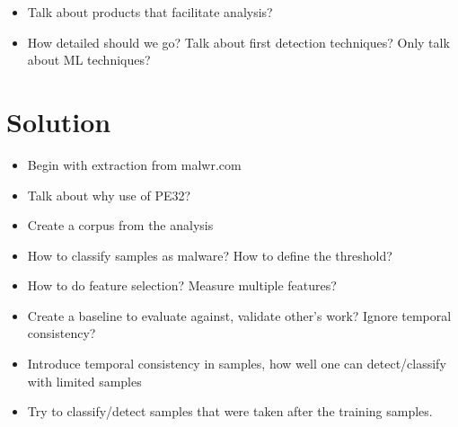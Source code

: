 \documentclass{llncs}
\begin{document}
\begin{itemize}
	\item Talk about products that facilitate analysis?
	\item How detailed should we go? Talk about first detection techniques? Only talk about ML techniques?
\end{itemize}

% 






\section{Solution}\label{sec_solution}

\begin{itemize}
	\item Begin with extraction from malwr.com
	\item Talk about why use of PE32?
	\item Create a corpus from the analysis
	\item How to classify samples as malware? How to define the threshold?
	\item How to do feature selection? Measure multiple features?
	\item Create a baseline to evaluate against, validate other's work? Ignore temporal consistency?
	\item Introduce temporal consistency in samples, how well one can detect/classify with limited samples
	\item Try to classify/detect samples that were taken after the training samples.
\end{itemize}
\end{document}
